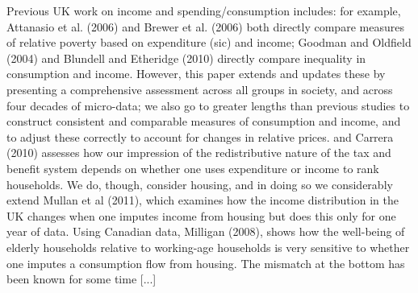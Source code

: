 Previous UK work on income and spending/consumption includes: for example, Attanasio et al. (2006) and Brewer et al. (2006) both directly compare measures of relative poverty based on expenditure (sic) and income; Goodman and Oldfield (2004) and Blundell and Etheridge (2010) directly compare inequality in consumption and income. However, this paper extends and updates these by presenting a comprehensive assessment across all groups in society, and across four decades of micro-data; we also go to greater lengths than previous studies to construct consistent and comparable measures of consumption and income, and to adjust these correctly to account for changes in relative prices. and Carrera (2010) assesses how our impression of the redistributive nature of the tax and benefit system depends on whether one uses expenditure or income to rank households. We do, though, consider housing, and in doing so we considerably extend Mullan et al (2011), which examines how the income distribution in the UK changes when one imputes income from housing but does this only for one year of data. Using Canadian data, Milligan (2008), shows how the well-being of elderly households relative to working-age households is very sensitive to whether one imputes a consumption flow from housing. The mismatch at the bottom has been known for some time [...]





